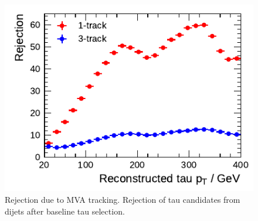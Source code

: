 \begin{figure}[ht]
  \centering
  \includegraphics{./figures/bdt_perf/mva_tracking_rejection.pdf}
  \caption{Rejection due to MVA tracking. Rejection of tau candidates from
    dijets after baseline tau selection.}
  \label{fig:mva_tracking_rejection}
\end{figure}

